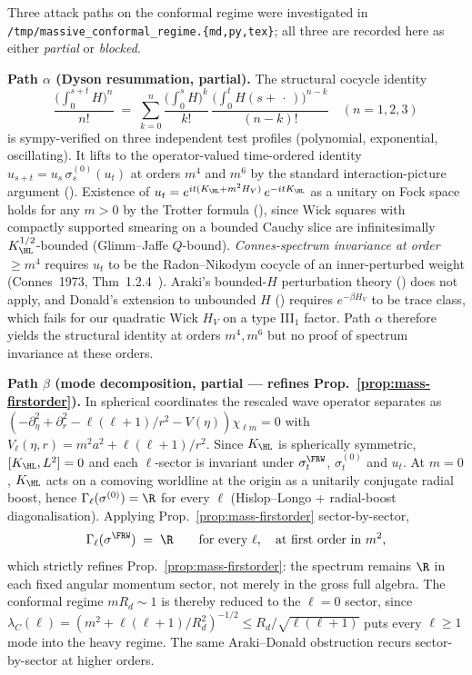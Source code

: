 \begin{remark}\label{rem:mass-conformal}
Three attack paths on the conformal regime were investigated in
\texttt{/tmp/massive\_conformal\_regime.\{md,py,tex\}}; all three are
recorded here as either \emph{partial} or \emph{blocked}.

\noindent\textbf{Path $\alpha$ (Dyson resummation, partial).}
The structural cocycle identity
\[
\frac{\bigl(\!\int_0^{s+t}\!\!H\bigr)^n}{n!}
\;=\;\sum_{k=0}^n
\frac{\bigl(\!\int_0^s\!H\bigr)^k}{k!}\,
\frac{\bigl(\!\int_0^t\!H(s+\,\cdot\,)\bigr)^{n-k}}{(n-k)!}
\quad(n=1,2,3)
\]
is sympy-verified on three independent test profiles (polynomial,
exponential, oscillating).  It lifts to the operator-valued time-ordered
identity $u_{s+t}=u_s\,\sigma^{(0)}_s(u_t)$ at orders $m^4$ and $m^6$
by the standard interaction-picture argument
(\cite[\S5]{BrunettiFredenhagenVerch2003}).
Existence of $u_t=e^{it(K_\HL+m^2 H_V)}\,e^{-itK_\HL}$ as a unitary on
Fock space holds for any $m>0$ by the Trotter formula
(\cite[Thm~X.51]{ReedSimonII}), since Wick squares with compactly
supported smearing on a bounded Cauchy slice are infinitesimally
$K_\HL^{1/2}$-bounded (Glimm--Jaffe $Q$-bound).
\emph{Connes-spectrum invariance at order $\ge m^4$} requires $u_t$ to
be the Radon--Nikodym cocycle of an inner-perturbed weight
(Connes~1973, Thm~1.2.4~\cite{Connes1973ENS}).
Araki's bounded-$H$ perturbation theory (\cite{Araki1973}) does not
apply, and Donald's extension to unbounded $H$
(\cite{Donald1981}) requires $e^{-\beta H_V}$ to be trace class, which
fails for our quadratic Wick $H_V$ on a type III$_1$ factor.  Path
$\alpha$ therefore yields the structural identity at orders $m^4, m^6$
but no proof of spectrum invariance at these orders.

\noindent\textbf{Path $\beta$ (mode decomposition, partial — refines
Prop.~\ref{prop:mass-firstorder}).}
In spherical coordinates the rescaled wave operator separates as
$(-\partial_\eta^2+\partial_r^2-\ell(\ell+1)/r^2-V(\eta))\chi_{\ell m}=0$
with $V_\ell(\eta,r)=m^2 a^2+\ell(\ell+1)/r^2$.  Since $K_\HL$ is
spherically symmetric, $[K_\HL,L^2]=0$ and each $\ell$-sector is
invariant under $\sigma^\FRW_t$, $\sigma^{(0)}_t$ and $u_t$.  At $m=0$,
$K_\HL$ acts on a comoving worldline at the origin as a unitarily
conjugate radial boost, hence $\Gamma_\ell(\sigma^{(0)})=\R$ for every
$\ell$ (Hislop--Longo + radial-boost diagonalisation).  Applying
Prop.~\ref{prop:mass-firstorder} sector-by-sector,
\[
\Gamma_\ell(\sigma^\FRW)\;=\;\R
\qquad\text{for every }\ell,\quad\text{at first order in }m^2,
\]
which strictly refines Prop.~\ref{prop:mass-firstorder}: the spectrum
remains $\R$ in each fixed angular momentum sector, not merely in the
gross full algebra.  The conformal regime $mR_d\sim 1$ is thereby
reduced to the $\ell=0$ sector, since
$\lambda_C(\ell)=(m^2+\ell(\ell+1)/R_d^2)^{-1/2}\le R_d/\sqrt{\ell(\ell+1)}$
puts every $\ell\ge 1$ mode into the heavy regime.  The same
Araki--Donald obstruction recurs sector-by-sector at higher orders.


\end{remark}
